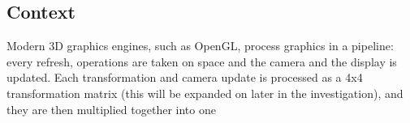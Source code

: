 \documentclass[12pt, a4paper]{article}
\begin{document}
    \subsection{Context}

    Modern 3D graphics engines, such as OpenGL, process graphics
    in a pipeline: every refresh, operations are taken on space
    and the camera and the display is updated. Each
    transformation and camera update is processed as a 4x4
    transformation matrix (this will be expanded on later in the
    investigation), and they are then multiplied together into
    one 

    \section{}
\end{document}
